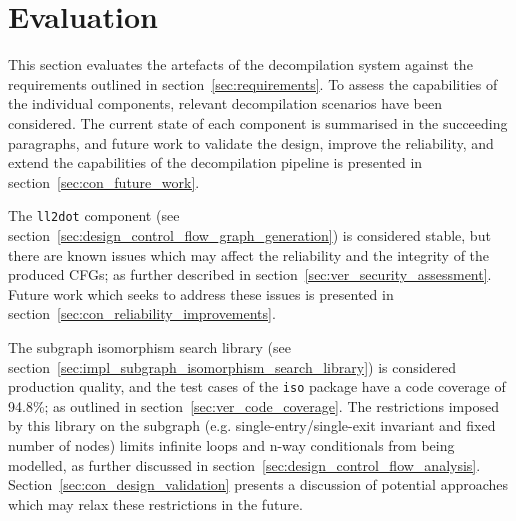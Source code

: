 
%

%
%

\section{Evaluation}
\label{sec:evaluation}

This section evaluates the artefacts of the decompilation system against the requirements outlined in section~\ref{sec:requirements}. To assess the capabilities of the individual components, relevant decompilation scenarios have been considered. The current state of each component is summarised in the succeeding paragraphs, and future work to validate the design, improve the reliability, and extend the capabilities of the decompilation pipeline is presented in section~\ref{sec:con_future_work}.

The \texttt{ll2dot} component (see section~\ref{sec:design_control_flow_graph_generation}) is considered stable, but there are known issues which may affect the reliability and the integrity of the produced CFGs; as further described in section~\ref{sec:ver_security_assessment}. Future work which seeks to address these issues is presented in section~\ref{sec:con_reliability_improvements}.

The subgraph isomorphism search library (see section~\ref{sec:impl_subgraph_isomorphism_search_library}) is considered production quality, and the test cases of the \texttt{iso} package have a code coverage of 94.8\%; as outlined in section~\ref{sec:ver_code_coverage}. The restrictions imposed by this library on the subgraph (e.g. single-entry/single-exit invariant and fixed number of nodes) limits infinite loops and n-way conditionals from being modelled, as further discussed in section~\ref{sec:design_control_flow_analysis}. Section~\ref{sec:con_design_validation} presents a discussion of potential approaches which may relax these restrictions in the future.

